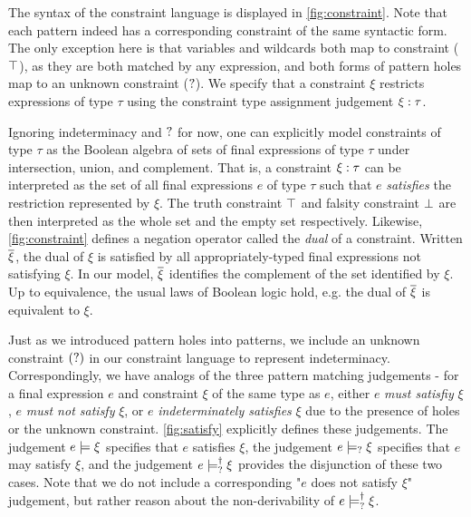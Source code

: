 

The syntax of the constraint language is displayed in \autoref{fig:constraint}. Note that each pattern indeed has a corresponding constraint of the same syntactic form. The only exception here is that variables and wildcards both map to constraint ($\top$), as they are both matched by any expression, and both forms of pattern holes map to an unknown constraint ($\mathtt{?}$). We specify that a constraint $\xi$ restricts expressions of type $\tau$ using the constraint type assignment judgement $\xi : \tau$. 

Ignoring indeterminacy and $\mathtt{?}$ for now, one can explicitly model constraints of type $\tau$ as the Boolean algebra of sets of final expressions of type $\tau$ under intersection, union, and complement. That is, a constraint $\xi : \tau$ can be interpreted as the set of all final expressions $e$ of type $\tau$ such that $e$ \emph{satisfies} the restriction represented by $\xi$. The truth constraint $\top$ and falsity constraint $\bot$ are then interpreted as the whole set and the empty set respectively. Likewise, \autoref{fig:constraint} defines a negation operator called the \emph{dual} of a constraint. Written $\overline{\xi}$, the dual of $\xi$ is satisfied by all appropriately-typed final expressions not satisfying $\xi$. In our model, $\overline{\xi}$ identifies the complement of the set identified by $\xi$. Up to equivalence, the usual laws of Boolean logic hold, e.g. the dual of $\overline{\xi}$ is equivalent to $\xi$.



Just as we introduced pattern holes into patterns, we include an unknown constraint $(\mathtt{?})$ in our constraint language to represent indeterminacy. Correspondingly, we have analogs of the three pattern matching judgements - for a final expression $e$ and constraint $\xi$ of the same type as $e$, either $e$ \emph{must satisfiy} $\xi$, $e$ \emph{must not satisfy} $\xi$, or $e$ \emph{indeterminately satisfies} $\xi$ due to the presence of holes or the unknown constraint. \autoref{fig:satisfy} explicitly defines these judgements. The judgement $e \models \xi$ specifies that $e$ satisfies $\xi$, the judgement $e \models_{?} \xi$ specifies that $e$ may satisfy $\xi$, and the judgement $e \models_{?}^{\dag} \xi$ provides the disjunction of these two cases. Note that we do not include a corresponding "$e$ does not satisfy $\xi$" judgement, but rather reason about the non-derivability of $e \models_{?}^{\dag} \xi$.

